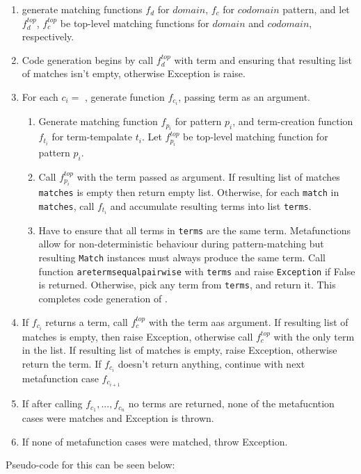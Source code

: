 \begin{enumerate}
\item generate matching functions $f_d$ for $domain$, $f_c$ for $codomain$ pattern, and let $f_d^{top}$, $f_c^{top}$ be top-level matching functions for $domain$ and $codomain$, respectively.
\item Code generation begins by call $f_d^{top}$ with term and ensuring that resulting list of matches isn't empty, otherwise Exception is raise.
\item For each $c_i =$ \MetafunctionCase, generate function $f_{c_i}$, passing term as an argument.
\begin{enumerate}
	\item Generate matching function $f_{p_i}$ for pattern $p_i$, and term-creation function $f_{t_i}$ for term-tempalate $t_i$. Let $f_{p_i}^{top}$ be top-level matching function for pattern $p_i$.
	\item Call $f_{p_i}^{top}$ with the term passed as argument. If resulting list of matches \texttt{matches} is empty then return empty list. Otherwise, for each \texttt{match} in \texttt{matches}, call $f_{t_i}$ and accumulate resulting terms into list \texttt{terms}.
	\item Have to ensure that all terms in \texttt{terms} are the same term. Metafunctions allow for non-deterministic behaviour during pattern-matching but resulting \texttt{Match} instances must always produce the same term.  Call function \texttt{aretermsequalpairwise} with \texttt{terms} and raise \texttt{Exception} if False is returned. Otherwise, pick any term from \texttt{terms}, and return it.
	This completes code generation of \MetafunctionCase.
\end{enumerate}
\item If $f_{c_i}$ returns a term, call $f_c^{top}$ with the term aas argument. If resulting list of matches is empty, then raise Exception, otherwise call $f_c^{top}$ with the only term in the list. If resulting list of matches is empty, raise Exception, otherwise return the term. If $f_{c_i}$ doesn't return anything, continue with next metafunction case $f_{c_{i+1}}$
\item If after calling $f_{c_1}, ..., f_{c_n}$ no terms are returned, none of the metafucntion cases were matches and Exception is thrown.
\item If none of metafunction cases were matched, throw Exception.
\end{enumerate}

Pseudo-code for this can be seen below:

